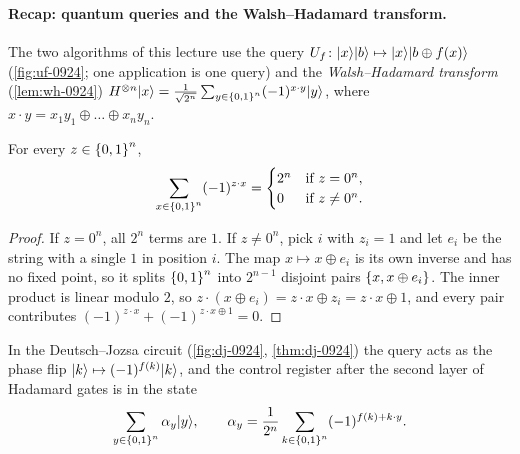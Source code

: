 
\paragraph{Recap: quantum queries and the Walsh--Hadamard transform.}

The two algorithms of this lecture use the query
$U_f \colon \lvert x \rangle\lvert b \rangle \mapsto \lvert x \rangle\lvert b \oplus f(x) \rangle$ (\cref{fig:uf-0924}; one application is
one query) and the \emph{Walsh--Hadamard transform} (\cref{lem:wh-0924})
$H^{\otimes n} \lvert x \rangle = \frac{1}{\sqrt{2^n}} \sum_{y \in \left\lbrace0,1\right\rbrace^n} (-1)^{x \cdot y} \lvert y \rangle$, where
$x \cdot y = x_1 y_1 \oplus \dots \oplus x_n y_n$.

\begin{claim}\label{lem:signsum-0929}
    For every $z \in \left\lbrace0,1\right\rbrace^n$,
    \[\sum_{x \in \left\lbrace0,1\right\rbrace^n} (-1)^{z \cdot x} =
        \begin{cases}
            2^n & \text{if } z = 0^n, \\
            0   & \text{if } z \neq 0^n.
        \end{cases}\]
\end{claim}

\begin{proof}
    If $z = 0^n$, all $2^n$ terms are $1$. If $z \neq 0^n$, pick $i$ with $z_i = 1$ and let $e_i$ be
    the string with a single $1$ in position $i$. The map $x \mapsto x \oplus e_i$ is its own inverse
    and has no fixed point, so it splits $\left\lbrace0,1\right\rbrace^n$ into $2^{n-1}$ disjoint pairs
    $\left\lbrace x, x \oplus e_i\right\rbrace$. The inner product is linear modulo $2$, so
    $z \cdot (x \oplus e_i) = z \cdot x \oplus z_i = z \cdot x \oplus 1$, and every pair contributes
    $(-1)^{z \cdot x} + (-1)^{z \cdot x \oplus 1} = 0$.
\end{proof}

In the Deutsch--Jozsa circuit (\cref{fig:dj-0924}, \cref{thm:dj-0924}) the query acts as the phase
flip $\lvert k \rangle \mapsto (-1)^{f(k)} \lvert k \rangle$, and the control register after the second layer of Hadamard
gates is in the state
\begin{equation}\label{eq:dj-state-0929}
    \sum_{y \in \left\lbrace0,1\right\rbrace^n} \alpha_y \lvert y \rangle,
    \qquad
    \alpha_y = \frac{1}{2^n} \sum_{k \in \left\lbrace0,1\right\rbrace^n} (-1)^{f(k) + k \cdot y}.
\end{equation}

